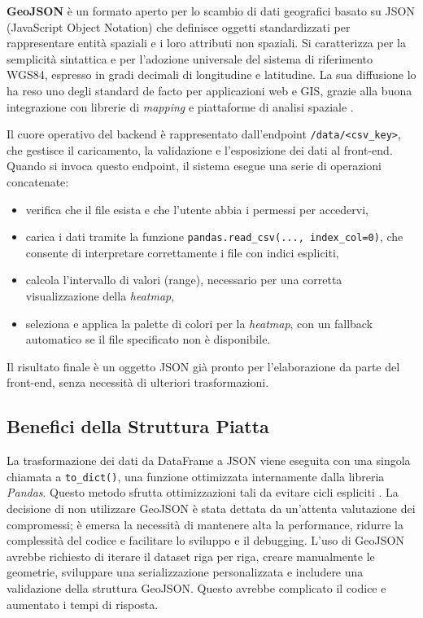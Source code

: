 \textbf{GeoJSON} è un formato aperto per lo scambio di dati geografici basato su
JSON (JavaScript Object Notation) che definisce oggetti standardizzati per
rappresentare entità spaziali e i loro attributi non spaziali. Si caratterizza per
la semplicità sintattica e per l'adozione universale del sistema di riferimento WGS84,
espresso in gradi decimali di longitudine e latitudine. La sua diffusione lo ha reso
uno degli standard de facto per applicazioni web e GIS, grazie alla buona
integrazione con librerie di \textit{mapping} e piattaforme di analisi spaziale \cite{geojson-spec,rfc7946}.

Il cuore operativo del backend è rappresentato dall'endpoint \texttt{/data/<csv\_key>},
che gestisce il caricamento, la validazione e l'esposizione dei dati al front-end.
Quando si invoca questo endpoint, il sistema esegue una serie di operazioni
concatenate:

\begin{itemize}
  \item verifica che il file esista e che l'utente abbia i permessi per accedervi,

  \item carica i dati tramite la funzione \texttt{pandas.read\_csv(..., index\_col=0)},
    che consente di interpretare correttamente i file con indici espliciti,
    \cite{pandas-readcsv}

  \item calcola l'intervallo di valori (range), necessario per una corretta
    visualizzazione della \textit{heatmap},

  \item seleziona e applica la palette di colori per la \textit{heatmap}, con un
    fallback automatico se il file specificato non è disponibile.
\end{itemize}

\noindent
Il risultato finale è un oggetto JSON già pronto per l'elaborazione da parte del
front-end, senza necessità di ulteriori trasformazioni.

\newpage

\subsection{Benefici della Struttura Piatta}
\label{ss:why-not-geojson}

La trasformazione dei dati da DataFrame a JSON viene eseguita con una singola
chiamata a \texttt{to\_dict()}, una funzione ottimizzata internamente dalla
libreria \textit{Pandas}. Questo metodo sfrutta ottimizzazioni tali da evitare
cicli espliciti \cite{pandas-performance}. La decisione di non utilizzare GeoJSON
è stata dettata da un'attenta valutazione dei compromessi; è emersa la necessità
di mantenere alta la performance, ridurre la complessità del codice e facilitare
lo sviluppo e il debugging. L'uso di GeoJSON avrebbe richiesto di iterare il
dataset riga per riga, creare manualmente le geometrie, sviluppare una
serializzazione personalizzata e includere una validazione della struttura
GeoJSON. Questo avrebbe complicato il codice e aumentato i tempi di risposta.

